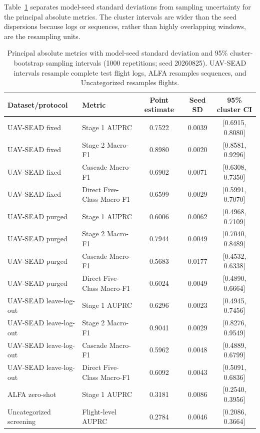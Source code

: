 Table~\ref{tab:absolute_uncertainty} separates model-seed standard deviations from sampling uncertainty for the principal absolute metrics. The cluster intervals are wider than the seed dispersions because logs or sequences, rather than highly overlapping windows, are the resampling units.

\begin{table}[H]
\caption{Principal absolute metrics with model-seed standard deviation and 95\% cluster-bootstrap sampling intervals (1000 repetitions; seed 20260825). UAV-SEAD intervals resample complete test flight logs, ALFA resamples sequences, and Uncategorized resamples flights.\label{tab:absolute_uncertainty}}
\centering
\scriptsize
\begin{tabularx}{\textwidth}{l l c c c}
\toprule
\textbf{Dataset/protocol} & \textbf{Metric} & \textbf{Point estimate} & \textbf{Seed SD} & \textbf{95\% cluster CI}\\
\midrule
UAV-SEAD fixed & Stage 1 AUPRC & 0.7522 & 0.0039 & [0.6915, 0.8080]\\
UAV-SEAD fixed & Stage 2 Macro-F1 & 0.8980 & 0.0020 & [0.8581, 0.9296]\\
UAV-SEAD fixed & Cascade Macro-F1 & 0.6902 & 0.0071 & [0.6308, 0.7350]\\
UAV-SEAD fixed & Direct Five-Class Macro-F1 & 0.6599 & 0.0029 & [0.5991, 0.7070]\\
UAV-SEAD purged & Stage 1 AUPRC & 0.6006 & 0.0062 & [0.4968, 0.7109]\\
UAV-SEAD purged & Stage 2 Macro-F1 & 0.7944 & 0.0049 & [0.7040, 0.8489]\\
UAV-SEAD purged & Cascade Macro-F1 & 0.5683 & 0.0177 & [0.4532, 0.6338]\\
UAV-SEAD purged & Direct Five-Class Macro-F1 & 0.6024 & 0.0049 & [0.4890, 0.6664]\\
UAV-SEAD leave-log-out & Stage 1 AUPRC & 0.6296 & 0.0023 & [0.4945, 0.7456]\\
UAV-SEAD leave-log-out & Stage 2 Macro-F1 & 0.9041 & 0.0029 & [0.8276, 0.9549]\\
UAV-SEAD leave-log-out & Cascade Macro-F1 & 0.5962 & 0.0048 & [0.4889, 0.6799]\\
UAV-SEAD leave-log-out & Direct Five-Class Macro-F1 & 0.6092 & 0.0043 & [0.5091, 0.6836]\\
ALFA zero-shot & Stage 1 AUPRC & 0.3181 & 0.0086 & [0.2540, 0.3956]\\
Uncategorized screening & Flight-level AUPRC & 0.2784 & 0.0046 & [0.2086, 0.3664]\\
\bottomrule
\end{tabularx}
\end{table}

